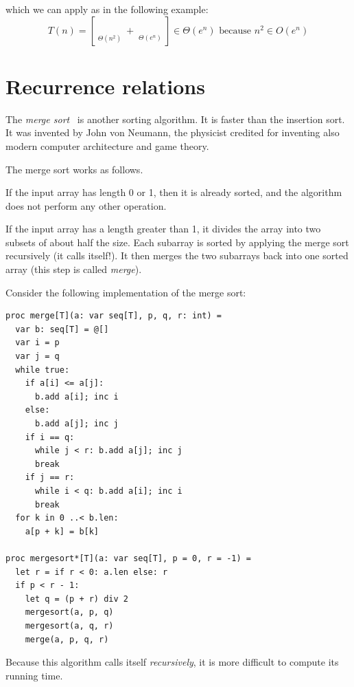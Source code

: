 \documentclass[justified, sixbynine]{tufte-book}
\def\stackunder#1#2{\mathrel{\mathop{#2}\limits_{#1}}}
\theoremstyle{plain}%
\newtheorem * {corollary}{Corollary}
\theoremstyle{definition}
\theoremstyle{remark}
\newtheorem * {remark}{Remark}
\newtheorem * {note}{Note}
\begin{document}
\begin{fullwidth}
which we can apply as in the following example:
\begin{equation}
T(n)=[\stackunder{\Theta (n^2)}{\underbrace{n^2+n+3}}+\stackunder{\Theta
(e^n)}{\underbrace{e^n-\log n}}]\in \Theta (e^n)\text{ because }n^2\in
O(e^n)
\end{equation}

\goodbreak\section{Recurrence relations}



The {\it merge sort}~\cite{mergesort} is another sorting algorithm. It is faster than the insertion sort. It was invented by John von Neumann, the physicist credited for inventing also modern computer architecture and game theory.

The merge sort works as follows.

If the input array has length 0 or 1, then it is already sorted, and the algorithm does not perform any other operation.

If the input array has a length greater than 1, it divides the array into two subsets of about half the size. Each subarray is sorted by applying the merge sort recursively (it calls itself!). It then merges the two subarrays back into one sorted array (this step is called {\it merge}).

Consider the following implementation of the merge sort:

\begin{lstlisting}
proc merge[T](a: var seq[T], p, q, r: int) =
  var b: seq[T] = @[]
  var i = p
  var j = q
  while true:
    if a[i] <= a[j]:
      b.add a[i]; inc i
    else:
      b.add a[j]; inc j
    if i == q:
      while j < r: b.add a[j]; inc j
      break
    if j == r:
      while i < q: b.add a[i]; inc i
      break
  for k in 0 ..< b.len:
    a[p + k] = b[k]

proc mergesort*[T](a: var seq[T], p = 0, r = -1) =
  let r = if r < 0: a.len else: r
  if p < r - 1:
    let q = (p + r) div 2
    mergesort(a, p, q)
    mergesort(a, q, r)
    merge(a, p, q, r)
\end{lstlisting}


Because this algorithm calls itself {\it recursively}, it is more difficult to compute its running time.


\end{fullwidth}
\end{document}
